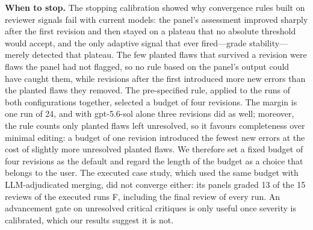 \textbf{When to stop.} The stopping calibration showed why convergence rules built on reviewer signals fail with current models: the panel's assessment improved sharply after the first revision and then stayed on a plateau that no absolute threshold would accept, and the only adaptive signal that ever fired---grade stability---merely detected that plateau. The few planted flaws that survived a revision were flaws the panel had not flagged, so no rule based on the panel's output could have caught them, while revisions after the first introduced more new errors than the planted flaws they removed. The pre-specified rule, applied to the runs of both configurations together, selected a budget of four revisions. The margin is one run of 24, and with gpt-5.6-sol alone three revisions did as well; moreover, the rule counts only planted flaws left unresolved, so it favours completeness over minimal editing: a budget of one revision introduced the fewest new errors at the cost of slightly more unresolved planted flaws. We therefore set a fixed budget of four revisions as the default and regard the length of the budget as a choice that belongs to the user. The executed case study, which used the same budget with LLM-adjudicated merging, did not converge either: its panels graded 13 of the 15 reviews of the executed runs F, including the final review of every run. An advancement gate on unresolved critical critiques is only useful once severity is calibrated, which our results suggest it is not.

